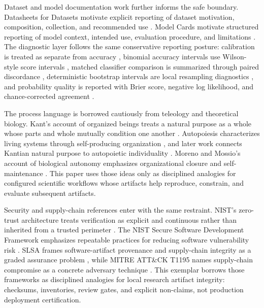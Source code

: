 \documentclass[
]{article}
\begin{document}
Dataset and model documentation work further informs the safe boundary.
Datasheets for Datasets motivate explicit reporting of dataset
motivation, composition, collection, and recommended use
\citep{gebru2021datasheets}. Model Cards motivate structured reporting
of model context, intended use, evaluation procedure, and limitations
\citep{mitchell2019model_cards}. The diagnostic layer follows the same
conservative reporting posture: calibration is treated as separate from
accuracy \citep{guo2017calibration}, binomial accuracy intervals use
Wilson-style score intervals \citep{wilson1927probable_inference},
matched classifier comparison is summarized through paired discordance
\citep{dietterich1998statistical_tests}, deterministic bootstrap
intervals are local resampling diagnostics \citep{efron1993bootstrap},
and probability quality is reported with Brier score, negative log
likelihood, and chance-corrected agreement
\citep{brier1950verification, cohen1960coefficient}.

The process language is borrowed cautiously from teleology and
theoretical biology. Kant's account of organized beings treats a natural
purpose as a whole whose parts and whole mutually condition one another
\citep{ginsborg_kant_aesthetics_teleology}. Autopoiesis characterizes
living systems through self-producing organization
\citep{varela_autopoiesis_1974}, and later work connects Kantian natural
purpose to autopoietic individuality
\citep{weber_varela_life_after_kant_2002}. Moreno and Mossio's account
of biological autonomy emphasizes organizational closure and
self-maintenance \citep{moreno_mossio_biological_autonomy_2015}. This
paper uses those ideas only as disciplined analogies for configured
scientific workflows whose artifacts help reproduce, constrain, and
evaluate subsequent artifacts.

Security and supply-chain references enter with the same restraint.
NIST's zero-trust architecture treats verification as explicit and
continuous rather than inherited from a trusted perimeter
\citep{nist_sp800_207_zero_trust}. The NIST Secure Software Development
Framework emphasizes repeatable practices for reducing software
vulnerability risk \citep{nist_sp800_218_ssdf}. SLSA frames
software-artifact provenance and supply-chain integrity as a graded
assurance problem \citep{slsa_spec_latest}, while MITRE ATT\&CK T1195
names supply-chain compromise as a concrete adversary technique
\citep{mitre_attack_t1195}. This exemplar borrows those frameworks as
disciplined analogies for local research artifact integrity: checksums,
inventories, review gates, and explicit non-claims, not production
deployment certification.
\end{document}
